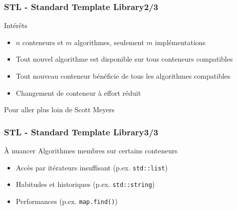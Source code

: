 \documentclass[C++.tex]{subfiles}
\begin{document}
\begin{frame}
	\frametitle{STL - Standard Template Library\titlehfill{}2/3}
	\begin{block}{Intérêts}
		\begin{itemize}
			\item $n$ conteneurs et $m$ algorithmes, seulement $m$ implémentations


			\item Tout nouvel algorithme est disponible sur tous conteneurs compatibles
			\item Tout nouveau conteneur bénéficie de tous les algorithmes compatibles


			\item Changement de conteneur à effort réduit
		\end{itemize}
	\end{block}

	\begin{block}{Pour aller plus loin}
		\cite{effStl} de Scott Meyers
	\end{block}
\end{frame}

\begin{frame}
	\frametitle{STL - Standard Template Library\titlehfill{}3/3}
	\begin{block}{À nuancer}
		Algorithmes membres sur certains conteneurs
		\begin{itemize}
			\item Accès par itérateurs insuffisant (p.ex. \lstinline|std::list|)
			\item Habitudes et historiques (p.ex. \lstinline|std::string|)
			\item Performances (p.ex. \lstinline|map.find()|)
		\end{itemize}
	\end{block}
\end{frame}
\end{document}
